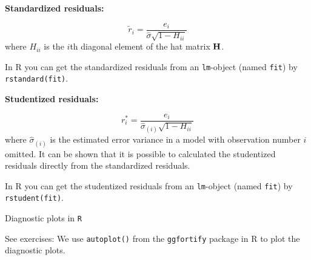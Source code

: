 \documentclass[
  10pt,
  ignorenonframetext,
]{beamer}
\begin{document}
\begin{frame}[fragile]
\textbf{Standardized residuals:}

\[\tilde{r}_i=\frac{e_i}{\hat{\sigma}\sqrt{1-H_{ii}}}\] where \(H_{ii}\)
is the \(i\)th diagonal element of the hat matrix \({\bf H}\).

In R you can get the standardized residuals from an \texttt{lm}-object
(named \texttt{fit}) by \texttt{rstandard(fit)}.

\vspace{2mm}

\textbf{Studentized residuals:}

\[r^*_i=\frac{e_i}{\hat{\sigma}_{(i)}\sqrt{1-H_{ii}}}\] where
\(\hat{\sigma}_{(i)}\) is the estimated error variance in a model with
observation number \(i\) omitted. It can be shown that it is possible to
calculated the studentized residuals directly from the standardized
residuals.

In R you can get the studentized residuals from an \texttt{lm}-object
(named \texttt{fit}) by \texttt{rstudent(fit)}.
\end{frame}

\begin{frame}[fragile]
\begin{block}{Diagnostic plots in \texttt{R}}
\protect\hypertarget{diagnostic-plots-in-r}{}
\vspace{2mm}

See exercises: We use \texttt{autoplot()} from the \texttt{ggfortify}
package in R to plot the diagnostic plots.
\end{block}
\end{frame}
\end{document}

